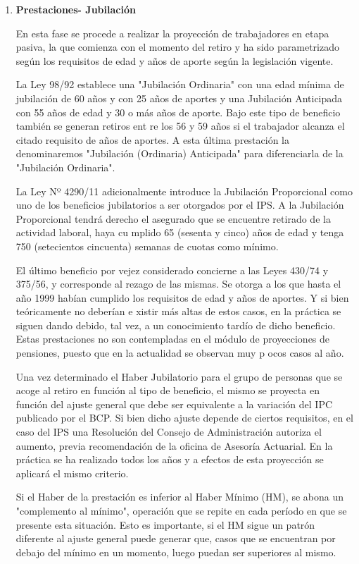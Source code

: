 \begin{enumerate}
\item   \textbf{Prestaciones- Jubilación}

En esta fase se procede a realizar la proyección de trabajadores en etapa pasiva, la que comienza con el momento del retiro y ha sido parametrizado según los requisitos de edad y años de aporte según la legislación vigente.

La Ley 98/92 establece una "Jubilación Ordinaria" con una edad mínima de jubilación de 60 años y con 25 años de aportes y una Jubilación Anticipada con 55 años de edad y 30 o más años de aporte. Bajo este tipo de beneficio también se generan retiros ent
re los 56 y 59 años si el trabajador alcanza el citado requisito de años de aportes. A esta última prestación la denominaremos "Jubilación (Ordinaria) Anticipada" para diferenciarla de la "Jubilación Ordinaria".

La Ley Nº 4290/11 adicionalmente introduce la Jubilación Proporcional como uno de los beneficios jubilatorios a ser otorgados por el IPS. A la Jubilación Proporcional tendrá derecho el asegurado que se encuentre retirado de la actividad laboral, haya cu
mplido 65 (sesenta y cinco) años de edad y tenga 750 (setecientos cincuenta) semanas de cuotas como mínimo.

El último beneficio por vejez considerado concierne a las Leyes 430/74 y 375/56, y corresponde al rezago de las mismas. Se otorga a los que hasta el año 1999 habían cumplido los requisitos de edad y años de aportes.  Y si bien teóricamente no deberían e
xistir más altas de estos casos, en la práctica se siguen dando debido, tal vez, a un conocimiento tardío de dicho beneficio. Estas prestaciones no son contempladas en el módulo de proyecciones de pensiones, puesto que en la actualidad se observan muy p
ocos casos al año.

Una vez determinado el Haber Jubilatorio para el grupo de personas que se acoge al retiro en función al tipo de beneficio, el mismo se proyecta en función del ajuste general que debe ser equivalente a la variación del IPC publicado por el BCP.  Si bien 
dicho ajuste depende de ciertos requisitos, en el caso del IPS una Resolución del Consejo de Administración autoriza el aumento, previa recomendación de la oficina de Asesoría Actuarial. En la práctica se ha realizado todos los años y a efectos de esta 
proyección se aplicará el mismo criterio.

Si el Haber de la prestación es inferior al Haber Mínimo (HM), se abona un "complemento al mínimo", operación que se repite en cada período en que se presente esta situación. Esto es importante, si el HM sigue un patrón diferente al ajuste general puede
 generar que, casos que se encuentran por debajo del mínimo en un momento, luego puedan ser superiores al mismo.


\end{enumerate}
